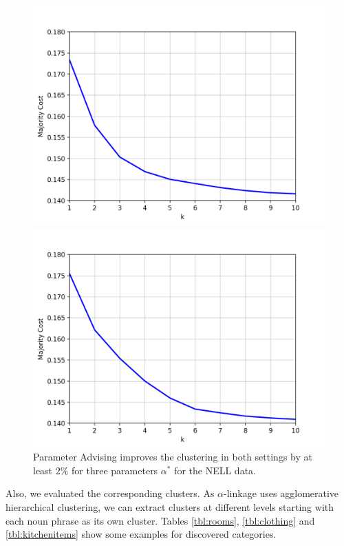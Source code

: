 \begin{figure}[h]
\centering
\begin{minipage}{.45\textwidth}
  \centering
  \includegraphics[width=\linewidth]{plots/nell_sc_1000_top10}
\end{minipage}
\begin{minipage}{.45\textwidth}
  \centering
  \includegraphics[width=\linewidth]{plots/nell_ac_1000_top10}
\end{minipage}
\caption{Parameter Advising improves the clustering in both settings by at least $2\%$ for three parameters $\alpha^*$ for the NELL data.} 
\label{fig:nell1000top10}
\end{figure}

Also, we evaluated the corresponding clusters. As $\alpha$-linkage uses agglomerative hierarchical clustering, we can extract clusters at different levels starting with each noun phrase as its own cluster. Tables \ref{tbl:rooms}, \ref{tbl:clothing} and \ref{tbl:kitchenitems} show some examples for discovered categories.

